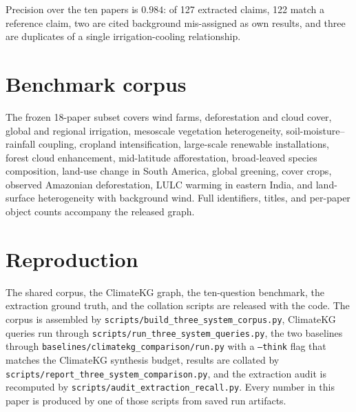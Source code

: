 Precision over the ten papers is $0.984$: of 127 extracted claims, 122 match a
reference claim, two are cited background mis-assigned as own results, and three are
duplicates of a single irrigation-cooling relationship.

\section{Benchmark corpus}
\label{app:corpus}

The frozen 18-paper subset covers wind farms, deforestation and cloud cover, global
and regional irrigation, mesoscale vegetation heterogeneity, soil-moisture--rainfall
coupling, cropland intensification, large-scale renewable installations, forest cloud
enhancement, mid-latitude afforestation, broad-leaved species composition, land-use
change in South America, global greening, cover crops, observed Amazonian
deforestation, LULC warming in eastern India, and land-surface heterogeneity with
background wind. Full identifiers, titles, and per-paper object counts accompany the
released graph.

\section{Reproduction}
\label{app:repro}

The shared corpus, the ClimateKG graph, the ten-question benchmark, the extraction
ground truth, and the collation scripts are released with the code. The corpus is
assembled by \texttt{scripts/build\_three\_system\_corpus.py}, ClimateKG queries run
through \texttt{scripts/run\_three\_system\_queries.py}, the two baselines through
\texttt{baselines/climatekg\_comparison/run.py} with a \texttt{--think} flag that
matches the ClimateKG synthesis budget, results are collated by
\texttt{scripts/report\_three\_system\_comparison.py}, and the extraction audit is
recomputed by \texttt{scripts/audit\_extraction\_recall.py}. Every number in this paper
is produced by one of those scripts from saved run artifacts.
